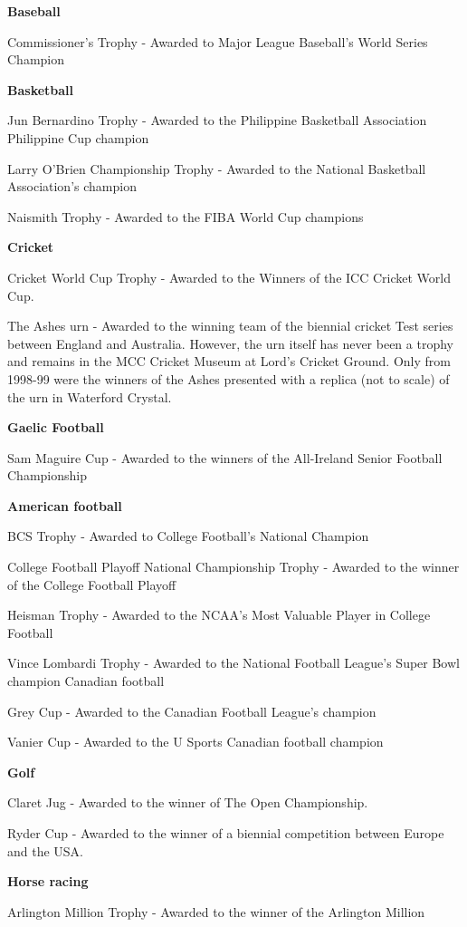 \documentclass[
  openany]{book}
\begin{document}
\textbf{Baseball}

Commissioner's Trophy - Awarded to Major League Baseball's World Series Champion

\textbf{Basketball}

Jun Bernardino Trophy - Awarded to the Philippine Basketball Association Philippine Cup champion

Larry O'Brien Championship Trophy - Awarded to the National Basketball Association's champion

Naismith Trophy - Awarded to the FIBA World Cup champions

\textbf{Cricket}

Cricket World Cup Trophy - Awarded to the Winners of the ICC Cricket World Cup.

The Ashes urn - Awarded to the winning team of the biennial cricket Test series between England and Australia. However, the urn itself has never been a trophy and remains in the MCC Cricket Museum at Lord's Cricket Ground. Only from 1998-99 were the winners of the Ashes presented with a replica (not to scale) of the urn in Waterford Crystal.

\textbf{Gaelic Football}

Sam Maguire Cup - Awarded to the winners of the All-Ireland Senior Football Championship

\textbf{American football}

BCS Trophy - Awarded to College Football's National Champion

College Football Playoff National Championship Trophy - Awarded to the winner of the College Football Playoff

Heisman Trophy - Awarded to the NCAA's Most Valuable Player in College Football

Vince Lombardi Trophy - Awarded to the National Football League's Super Bowl champion
Canadian football

Grey Cup - Awarded to the Canadian Football League's champion

Vanier Cup - Awarded to the U Sports Canadian football champion

\textbf{Golf}

Claret Jug - Awarded to the winner of The Open Championship.

Ryder Cup - Awarded to the winner of a biennial competition between Europe and the USA.

\textbf{Horse racing}

Arlington Million Trophy - Awarded to the winner of the Arlington Million
\end{document}
